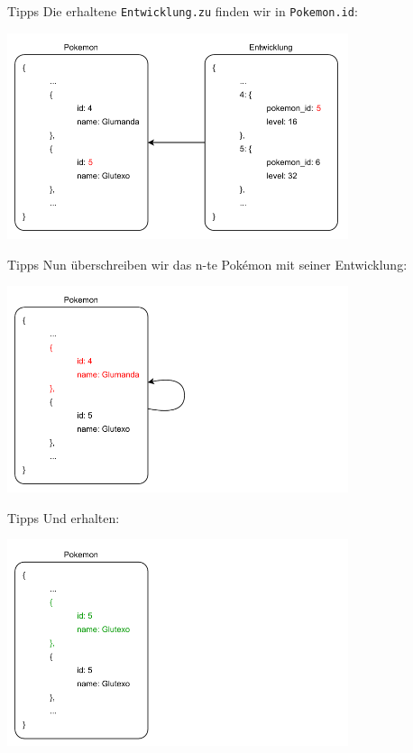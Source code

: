 \begin{frame}{Tipps}
    Die erhaltene \texttt{Entwicklung.zu} finden wir in \texttt{Pokemon.id}:

    \begin{center}
        \includegraphics[width=0.75\textwidth]{pictures/example_3.pdf}
    \end{center}
\end{frame}

\begin{frame}{Tipps}
    Nun überschreiben wir das n-te Pokémon mit seiner Entwicklung:

    \begin{center}
        \includegraphics[width=0.75\textwidth]{pictures/example_4.pdf}
    \end{center}
\end{frame}

\begin{frame}{Tipps}
    Und erhalten:

    \begin{center}
        \includegraphics[width=0.75\textwidth]{pictures/example_5.pdf}
    \end{center}
\end{frame}

